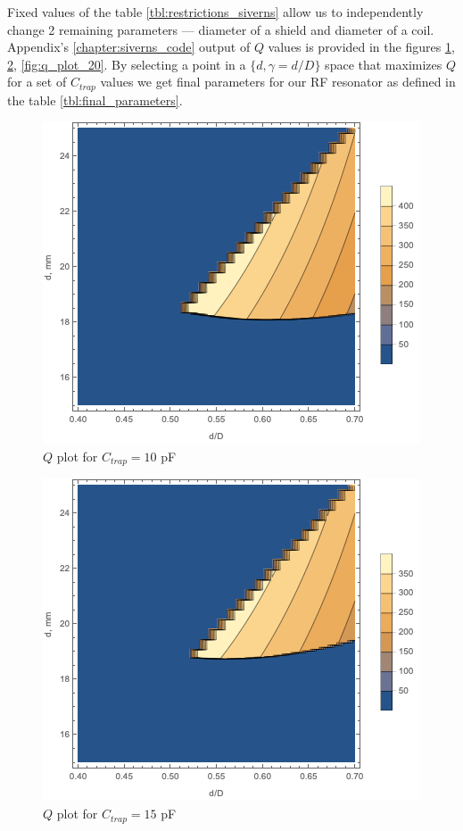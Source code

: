 Fixed values of the table \ref{tbl:restrictions_siverns} allow us to independently change 2 remaining parameters --- diameter of a shield and diameter of a coil. Appendix's \ref{chapter:siverns_code} output of $Q$ values is provided in the figures \ref{fig:q_plot_10}, \ref{fig:q_plot_15}, \ref{fig:q_plot_20}. By selecting a point in a $\{d, \gamma = d / D\}$ space that maximizes $Q$ for a set of $C_{trap}$ values we get final parameters for our RF resonator as defined in the table \ref{tbl:final_parameters}.
\clearpage
\begin{figure}[!h]
\centering
\includegraphics[width=.78\textwidth]{images/q_plot_siverns_tex_10}
\caption{$Q$ plot for $C_{trap} = 10$ pF}
\label{fig:q_plot_10}
\end{figure}
\begin{figure}[!h]
\centering
\includegraphics[width=.78\textwidth]{images/q_plot_siverns_tex_15}
\caption{$Q$ plot for $C_{trap} = 15$ pF}
\label{fig:q_plot_15}
\end{figure}
